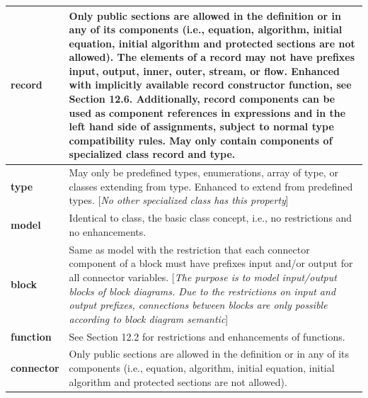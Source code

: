 \documentclass[10pt,a4paper]{report}
\def\Mcomment#1{{[}\emph{#1}{]}}
\begin{document}
\begin{longtable}{|p{4cm}|p{7cm}|}
\hline
\textbf{record} & Only public sections are allowed in the definition or
in any of its components (i.e., equation, algorithm, initial equation,
initial algorithm and protected sections are not allowed). The elements
of a record may not have prefixes input, output, inner, outer, stream,
or flow. Enhanced with implicitly available record constructor function,
see Section 12.6. Additionally, record components can be used as
component references in expressions and in the left hand side of
assignments, subject to normal type compatibility rules. May only
contain components of specialized class record and type.\\ \hline
\textbf{type} & May only be predefined types, enumerations, array of
type, or classes extending from type. Enhanced to extend from predefined
types. \Mcomment{No other specialized class has this
property}\\ \hline
\textbf{model} & Identical to class, the basic class concept, i.e., no
restrictions and no enhancements.\\ \hline
\textbf{block} & Same as model with the restriction that each connector
component of a block must have prefixes input and/or output for all
connector variables. \Mcomment{The purpose is to model input/output
blocks of block diagrams. Due to the restrictions on input and output
prefixes, connections between blocks are only possible according to
block diagram semantic}\\ \hline
\textbf{function} & See Section 12.2 for restrictions and enhancements
of functions.\\ \hline
\textbf{connector} & Only public sections are allowed in the definition
or in any of its components (i.e., equation, algorithm, initial
equation, initial algorithm and protected sections are not allowed).


\end{longtable}
\end{document}
